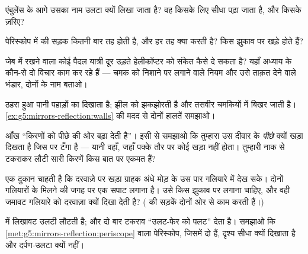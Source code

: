 \begin{exercise}[$\star$]\label{exo:g5:mirrors-reflection:5}
एंबुलेंस के आगे उसका नाम उलटा क्यों लिखा जाता है? वह किसके लिए सीधा
पढ़ा जाता है, और किसके ज़रिए?
\end{exercise}

\begin{exercise}[$\star$]\label{exo:g5:mirrors-reflection:6}
पेरिस्कोप में  की सड़क कितनी बार तह होती है, और हर तह क्या
करती है?  किस झुकाव पर खड़े होते हैं?
\end{exercise}

\begin{exercise}[$\star$]\label{exo:g5:mirrors-reflection:7}
जेब में  रखने वाला कोई पैदल यात्री दूर उड़ते हेलीकॉप्टर को संकेत
कैसे दे सकता है? यहाँ अध्याय के कौन-से दो विचार काम कर रहे हैं ---
चमक को निशाने पर लगाने वाले नियम और उसे ताक़त देने वाले भंडार, दोनों
के नाम बताओ।
\end{exercise}

\begin{exercise}[$\star$]\label{exo:g5:mirrors-reflection:8}
ठहरा हुआ पानी पहाड़ों का  दिखाता है;  झील को झकझोरती है
और तसवीर चमकियों में बिखर जाती है।
\cref{ex:g5:mirrors-reflection:walls} की मदद से दोनों हालतें समझाओ।
\end{exercise}

\begin{exercise}[$\star\star$]\label{exo:g5:mirrors-reflection:9}
आँख ``किरणों को पीछे की ओर बढ़ा देती है''। इसी से समझाओ कि तुम्हारा
 उस दीवार के \emph{पीछे} क्यों खड़ा दिखता है जिस पर 
टँगा है --- यानी वहाँ, जहाँ पक्के तौर पर कोई खड़ा नहीं होता। तुम्हारी
नाक से टकराकर लौटी सारी किरणें किस बात पर एकमत हैं?
\end{exercise}

\begin{exercise}[$\star\star$]\label{exo:g5:mirrors-reflection:10}
एक दुकान चाहती है कि दरवाज़े पर खड़ा ग्राहक अंधे मोड़ के उस पार गलियारे
में देख सके। दोनों गलियारों के मिलने की जगह पर एक सपाट  लगाना
है। उसे किस झुकाव पर लगाना चाहिए, और वही जमावट गलियारे को दरवाज़ा
क्यों दिखा देती है? ( की सड़कें दोनों ओर से काम करती हैं।)
\end{exercise}

\begin{exercise}[$\star\star$]\label{exo:g5:mirrors-reflection:11}
 में लिखावट उलटी लौटती है; और दो बार टकराव ``उलट-फेर को पलट''
देता है। समझाओ कि \cref{met:g5:mirrors-reflection:periscope} वाला
पेरिस्कोप, जिसमें दो  हैं, दृश्य सीधा क्यों दिखाता है और
दर्पण-उलटा क्यों नहीं।
\end{exercise}
